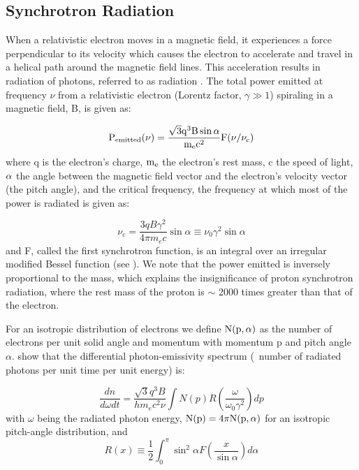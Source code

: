 \subsection{Synchrotron Radiation}\label{gamAstr:sync}
When a relativistic electron moves in a magnetic field, it experiences a force perpendicular to its velocity which causes the electron to accelerate and travel in a helical path around the magnetic field lines. This acceleration results in radiation of photons, referred to as \sync{} radiation \cite{Blumenthal70,Pacholczyk70,Rybicki86,Longair11}. The total power emitted at frequency $\nu$ from a relativistic electron (Lorentz factor, $\gamma \gg 1$) spiraling in a magnetic field, B, is given as:

\begin{equation}\label{eq:syncPow}
{\rm P_{emitted}(\nu) = 
\frac{\sqrt{3} q^3 B \sin\alpha}{m_e c^2} F(\nu/\nu_c) }
\end{equation}
where q is the electron's charge,  ${\rm m_e}$ the electron's rest mass, c the speed of light,  ${\rm \alpha }$ the angle between the magnetic field vector and the electron's velocity vector (the pitch angle), and the critical frequency, the frequency at which most of the power is radiated is given as:

\begin{equation}\label{eq:nuCrit}
\nu_c = \frac{3q B \gamma^2}{4\pi m_e c} 
\sin\alpha \equiv \nu_0 \gamma^2 \sin\alpha
\end{equation}
and F, called the first synchrotron function, is an integral over an irregular modified Bessel function (see \cite{Rybicki86}). We note that the power emitted is inversely proportional to the mass, which explains the insignificance of proton synchrotron radiation, where the rest mass of the proton is $\sim$ 2000 times greater than that of the electron.

For an isotropic distribution of electrons we define  ${\rm N(p,\alpha)}$ as the number of electrons per unit solid angle and momentum with momentum p and pitch angle $\alpha$. \cite{Houck06} show that the differential photon-emissivity spectrum (\ie{}\ number of radiated photons per unit time per unit energy) is:

\begin{equation}
\frac{d n}{d \omega d t} =
\frac{\sqrt{3}q^3 B}{h m_e c^2 \nu}
\int
N(p)
R \left(\frac{\omega}{\omega_0 \gamma^2}\right)dp
\end{equation}
with $\omega$ being the radiated photon energy, ${\rm N(p) = 4\pi N(p,\alpha)}$ for an isotropic pitch-angle distribution, and
\begin{equation}
R(x) \equiv \frac{1}{2} \int_0^\pi
\sin^2 \alpha
F\left(\frac{x}{\sin\alpha}\right) d \alpha 
\end{equation}


